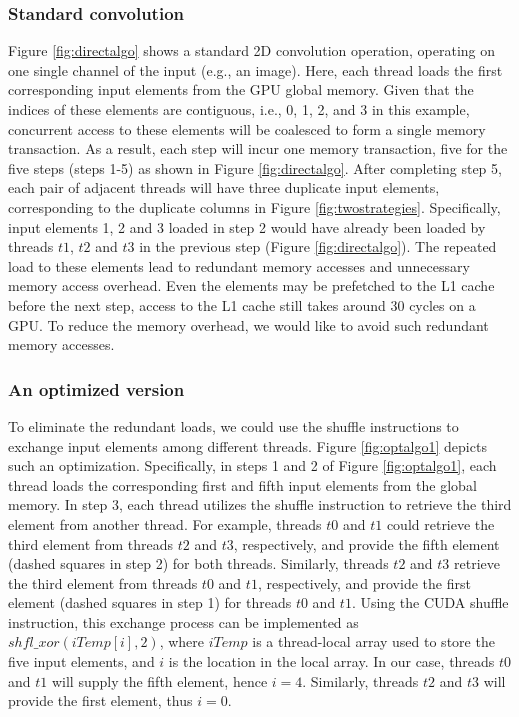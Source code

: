\subsubsection{Standard convolution} Figure \ref{fig:directalgo} shows a standard 2D convolution operation, operating on one single channel
of the input (e.g., an image). Here, each thread loads the first corresponding input elements from the GPU global memory. Given that the
indices of these elements are contiguous, i.e., 0, 1, 2, and 3 in this example, concurrent access to these elements will be coalesced to
form a single memory transaction. As a result, each step will incur one memory transaction, five for the five steps (steps 1-5) as shown in
Figure \ref{fig:directalgo}. After completing step 5, each pair of adjacent threads will have three duplicate input elements, corresponding
to the duplicate columns in Figure \ref{fig:twostrategies}. Specifically, input elements 1, 2 and 3 loaded in step 2 would have already
been loaded by threads $t1$, $t2$ and $t3$ in the previous step (Figure \ref{fig:directalgo}). The repeated load to these elements lead to
redundant memory accesses and unnecessary memory access overhead. Even the elements may be prefetched to the L1 cache before the next step,
access to the L1 cache still takes around 30 cycles on a GPU. To reduce the memory overhead, we would like to avoid such redundant memory
accesses.


\subsubsection{An optimized version} To eliminate the redundant loads, we could use the shuffle instructions to exchange input elements among
different threads.   Figure \ref{fig:optalgo1} depicts such an optimization. Specifically, in steps 1 and 2 of Figure \ref{fig:optalgo1},
each thread loads the corresponding first and fifth input elements from the global memory. In step 3, each thread utilizes the shuffle
instruction to retrieve the third element from another thread. For example, threads $t0$ and $t1$ could retrieve the third element from
threads $t2$ and $t3$, respectively, and provide the fifth element (dashed squares in step 2) for both threads. Similarly, threads $t2$ and
$t3$ retrieve the third element from threads $t0$ and $t1$, respectively, and provide the first element (dashed squares in step 1) for
threads $t0$ and $t1$. Using the CUDA shuffle instruction, this exchange process can be implemented as $shfl\_xor(iTemp[i],2)$, where
$iTemp$ is a thread-local array used to store the five input elements, and $i$ is the location in the local array. In our case, threads
$t0$ and $t1$ will supply the fifth element, hence $i=4$. Similarly, threads $t2$ and $t3$ will provide the first element, thus $i=0$.




